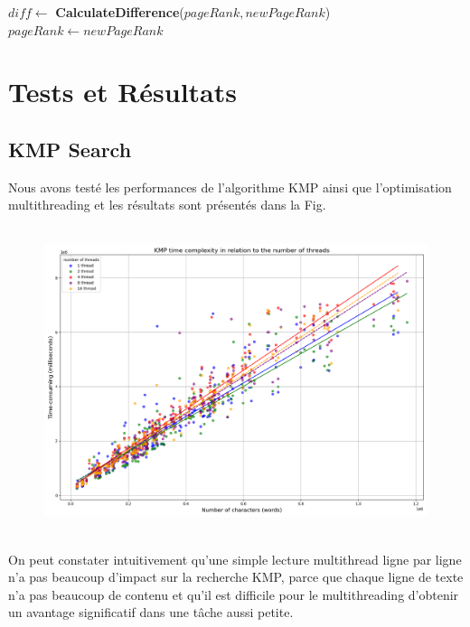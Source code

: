 \documentclass[11pt,english]{article}
\begin{document}
{\begin{algorithm}[H]
{            %
            $diff \gets$ \textbf{CalculateDifference}($pageRank, newPageRank$)\;
            $pageRank \gets newPageRank$\;
        }
        \;
    \end{algorithm}
        
        

    \section{Tests et Résultats}


    \subsection{KMP Search}

    \indent 
    
    Nous avons testé les performances de l'algorithme KMP ainsi que l'optimisation multithreading et les résultats sont présentés dans la Fig.

    \begin{figure}[H]
        \begin{center}
            \includegraphics[height=9cm]{./src/KMP_Multi.png}
        \end{center}
    \end{figure}

    \indent On peut constater intuitivement qu'une simple lecture multithread ligne par ligne n'a pas beaucoup d'impact sur la recherche KMP, parce que chaque ligne de texte n'a pas beaucoup de contenu et qu'il est difficile pour le multithreading d'obtenir un avantage significatif dans une tâche aussi petite.

}
\end{document}
